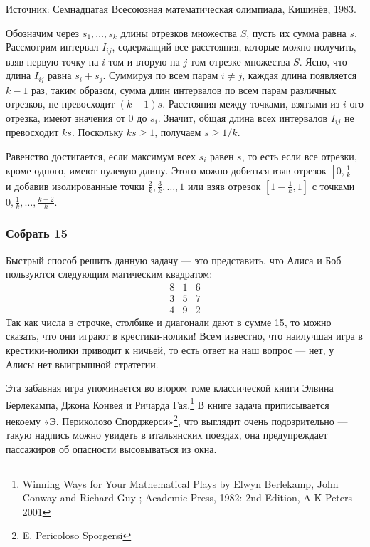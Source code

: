 {\small Источник: Семнадцатая Всесоюзная математическая олимпиада, Кишинёв, 1983.}

Обозначим через $s_1,\dots,s_k$ длины отрезков множества $S$,
пусть их сумма равна $s$.
Рассмотрим интервал $I_{ij}$, содержащий все расстояния, которые можно получить, взяв первую точку на $i$-том и вторую на $j$-том отрезке множества $S$.
Ясно, что длина $I_{ij}$ равна $s_i+s_j$.
Суммируя по всем парам $i\ne j$, 
каждая длина появляется $k-1$ раз,
таким образом, сумма длин интервалов по всем парам различных отрезков, не превосходит $(k-1) s$.
Расстояния между точками, взятыми из $i$-ого отрезка, имеют значения от $0$ до $s_i$.
Значит, общая длина всех интервалов $I_{ij}$ не превосходит $k s$.
Поскольку $k s\ge 1$, получаем $s\ge 1/k$.
\heart

Равенство достигается, если максимум всех $s_i$ равен $s$, 
то есть если все отрезки, кроме одного, имеют нулевую длину.
Этого можно добиться взяв отрезок $[0,\tfrac1k]$ и добавив изолированные точки
$\tfrac2k,\tfrac3k,\dots,1$ или взяв отрезок $[1-\tfrac1k,1]$ с точками
$0,\tfrac1k,\dots,\tfrac{k-2}k$.

\subsubsection*{Собрать 15} %

Быстрый способ решить данную задачу --- это представить, что Алиса и Боб пользуются следующим магическим квадратом:
$$
\begin{matrix}
8&1&6\\
3&5&7\\
4&9&2
\end{matrix}
$$
Так как числа в строчке, столбике и диагонали дают в сумме 15, то можно сказать, что они играют в крестики-нолики! 
Всем известно, что наилучшая игра в крестики-нолики приводит к ничьей,
то есть ответ на наш вопрос --- нет, у Алисы нет выигрышной стратегии.
\heart

Эта забавная игра упоминается во втором томе классической книги Элвина Берлекампа, Джона Конвея и Ричарда Гая.\footnote{Winning Ways for Your Mathematical Plays by Elwyn Berlekamp, John Conway and Richard Guy ; Academic Press, 1982: 2nd Edition, A K Peters 2001}
В книге задача приписывается некоему «Э. Периколозо Спорджерси»\footnote{E. Pericoloso Sporgersi}, что выглядит очень подозрительно --- такую надпись можно увидеть в итальянских поездах, она предупреждает пассажиров об опасности высовываться из окна.
